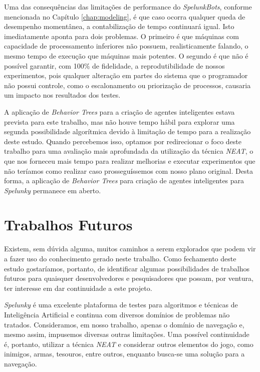 Uma das consequências das limitações de performance do \textit{SpelunkBots},
conforme mencionada no Capítulo \ref{chap:modeling}, é que caso ocorra qualquer
queda de desempenho momentânea, a contabilização de tempo continuará igual. Isto
imediatamente aponta para dois problemas. O primeiro é que máquinas com
capacidade de processamento inferiores não possuem, realisticamente falando, o
mesmo tempo de execução que máquinas mais potentes. O segundo é que não é
possível garantir, com 100\% de fidelidade, a reprodutibilidade de nossos
experimentos, pois qualquer alteração em partes do sistema que o programador não
possui controle, como o escalonamento ou priorização de processos, causaria um
impacto nos resultados dos testes.

A aplicação de \textit{Behavior Trees} para a criação de agentes inteligentes
estava prevista para este trabalho, mas não houve tempo hábil para explorar uma
segunda possibilidade algorítmica devido à limitação de tempo para a realização
deste estudo. Quando percebemos isso, optamos por redirecionar o foco deste
trabalho para uma avaliação mais aprofundada da utilização da técnica
\textit{NEAT}, o que nos forneceu mais tempo para realizar melhorias e executar
experimentos que não teríamos como realizar caso prosseguíssemos com nosso plano
original. Desta forma, a aplicação de \textit{Behavior Trees} para criação de
agentes inteligentes para \textit{Spelunky} permanece em aberto.


\section{Trabalhos Futuros}
Existem, sem dúvida alguma, muitos caminhos a serem explorados que podem vir a
fazer uso do conhecimento gerado neste trabalho. Como fechamento deste estudo
gostaríamos, portanto, de identificar algumas possibilidades de trabalhos
futuros para quaisquer desenvolvedores e pesquisadores que possam, por ventura,
ter interesse em dar continuidade a este projeto.

\textit{Spelunky} é uma excelente plataforma de testes para algoritmos e
técnicas de Inteligência Artificial e continua com diversos domínios de
problemas não tratados. Consideramos, em nosso trabalho, apenas o domínio de
navegação e, mesmo assim, impusemos diversas outras limitações. Uma possível
continuidade é, portanto, utilizar a técnica \textit{NEAT} e considerar outros
elementos do jogo, como inimigos, armas, tesouros, entre outros, enquanto
busca-se uma solução para a navegação.

